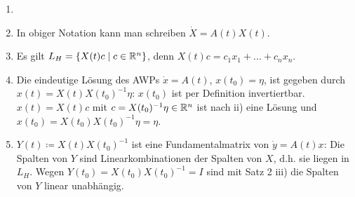 \begin{bemerkung}
	\begin{enumerate}
		\item[]
		\item In obiger Notation kann man schreiben $ \dot X=A(t)X(t) $.
		\item Es gilt $ L_H=\lbrace X(t)c\mid c\in\mathbb{R}^n\rbrace $, denn $ X(t)c=c_1x_1+...+c_nx_n $.
		\item Die eindeutige L\"osung des AWPs $ \dot x=A(t) $, $ x(t_0)=\eta $, ist gegeben durch $ x(t)=X(t)X(t_0)^{-1}\eta $: $ x(t_0) $ ist per Definition invertiertbar. $ x(t)=X(t)c $ mit $ c=X(t_0)^{-1}\eta\in\mathbb{R}^n $ ist nach ii) eine L\"osung und $ x(t_0)=X(t_0)X(t_0)^{-1}\eta=\eta $.
		\item $ Y(t)\coloneqq X(t)X(t_0)^{-1} $ ist eine Fundamentalmatrix von $ \dot y=A(t)x $: Die Spalten von $ Y $ sind Linearkombinationen der Spalten von $ X $, d.h. sie liegen in $ L_H $. Wegen $ Y(t_0)=X(t_0)X(t_0)^{-1}=I $ sind mit Satz 2 iii) die Spalten von $ Y $ linear unabh\"angig.
	\end{enumerate}
\end{bemerkung}
